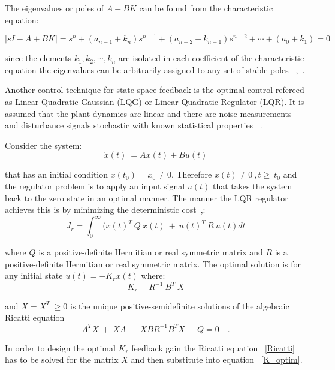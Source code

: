  The eigenvalues or poles of $A-BK$ can be found from the characteristic equation:
 
 \begin{equation}
 |sI-A+BK|=s^n +(a_{n-1}+k_n)s^{n-1}+(a_{n-2}+k_{n-1})s^{n-2}+ \cdots + (a_0+k_1) =0
 \end{equation}
 
 since the elements $k_1,k_2,\cdots,k_n$ are isolated in each coefficient of the characteristic equation the eigenvalues can be arbitrarily assigned to any set of stable poles ~\cite[Chapter~10]{Golnaraghi2010},~\cite[Chapter~10]{Ogata2009}.\smallskip
 
Another control technique for state-space feedback is the optimal control refereed as  Linear Quadratic Gaussian (LQG) or Linear Quadratic Regulator (LQR). It is assumed that the plant dynamics are linear and there are noise measurements and disturbance signals stochastic with known statistical properties ~\cite[Chapter~9]{Skogestad}.

Consider the system:
\begin{equation}
	\dot{x}(t)~=Ax(t)+Bu(t)
\end{equation} 

that has an initial condition $x(t_0)=x_0\neq 0$. Therefore $x(t) \neq 0~,t\geq ~t_0$ and the regulator problem is to apply an  input signal $u(t)$ that takes the system back to the zero state in an optimal manner. The manner the LQR regulator achieves this is by minimizing the deterministic cost~\cite[Chapter~9]{Skogestad},\cite[Chapter~3]{Golnaraghi2010}:
\begin{equation}
J_r=\int_{0}^{\infty}(x(t)^T~Q~x(t)~+~ u(t)^T~R~u(t)dt 
\end{equation}

where $Q$ is a positive-definite Hermitian or real symmetric matrix and $R$ is a positive-definite Hermitian or real symmetric matrix. The optimal solution is for any initial state $u(t)=-K_rx(t)$ where:
\begin{equation}
K_r=R^{-1}~B^T~X
\label{K_optim}
\end{equation}

and $X=X^T~\geq 0$ is the unique positive-semidefinite solutions of the algebraic Ricatti equation
\begin{equation}
A^TX~+~XA~-~XBR^{-1}B^TX~+Q=0\quad.
\label{Ricatti}
\end{equation}

In order to design the optimal $K_r$ feedback gain the Ricatti equation ~\ref{Ricatti} has to be solved for the matrix $X$ and then substitute into equation ~\ref{K_optim}.


